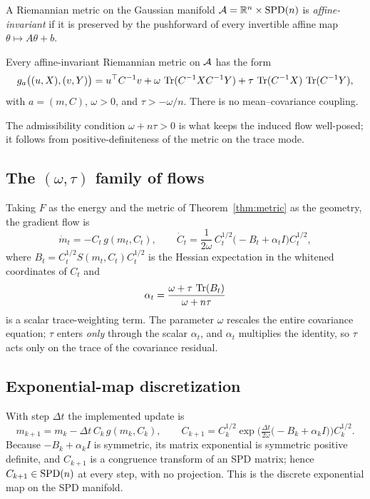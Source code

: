\documentclass[11pt]{article}
\begin{document}
A Riemannian metric on the Gaussian manifold
$\mathcal{A}=\mathbb{R}^{n}\times\mathrm{SPD}(n)$ is \emph{affine-invariant} if it is preserved by the
pushforward of every invertible affine map $\theta\mapsto A\theta+b$.

\begin{theorem}[Classification]\label{thm:metric}
Every affine-invariant Riemannian metric on $\mathcal{A}$ has the form
\begin{equation}
g_a\big((u,X),(v,Y)\big)
  = u^\top C^{-1} v
  + \omega\,\operatorname{Tr}(C^{-1}XC^{-1}Y)
  + \tau\,\operatorname{Tr}(C^{-1}X)\,\operatorname{Tr}(C^{-1}Y),
\end{equation}
with $a=(m,C)$, $\omega>0$, and $\tau>-\omega/n$. There is no mean--covariance
coupling.
\end{theorem}

The admissibility condition $\omega+n\tau>0$ is what keeps the induced flow
well-posed; it follows from positive-definiteness of the metric on the trace
mode.

\subsection{The $(\omega,\tau)$ family of flows}

Taking $F$ as the energy and the metric of Theorem~\ref{thm:metric} as the
geometry, the gradient flow is
\begin{equation}\label{eq:flow}
\dot m_t=-C_t\,g(m_t,C_t),\qquad
\dot C_t=\frac{1}{2\omega}\,C_t^{1/2}\big(-B_t+\alpha_t I\big)C_t^{1/2},
\end{equation}
where $B_t=C_t^{1/2}S(m_t,C_t)C_t^{1/2}$ is the Hessian expectation in the
whitened coordinates of $C_t$ and
\begin{equation}
\alpha_t=\frac{\omega+\tau\,\operatorname{Tr}(B_t)}{\omega+n\tau}
\end{equation}
is a scalar trace-weighting term. The parameter $\omega$ rescales the entire
covariance equation; $\tau$ enters \emph{only} through the scalar $\alpha_t$, and
$\alpha_t$ multiplies the identity, so $\tau$ acts only on the trace of the
covariance residual.

\subsection{Exponential-map discretization}

With step $\Delta t$ the implemented update is
\begin{equation}\label{eq:expmap}
m_{k+1}=m_k-\Delta t\,C_k\,g(m_k,C_k),\qquad
C_{k+1}=C_k^{1/2}\exp\!\Big(\tfrac{\Delta t}{2\omega}\big(-B_k+\alpha_k I\big)\Big)C_k^{1/2}.
\end{equation}
Because $-B_k+\alpha_k I$ is symmetric, its matrix exponential is symmetric
positive definite, and $C_{k+1}$ is a congruence transform of an SPD matrix;
hence $C_{k+1}\in\mathrm{SPD}(n)$ at every step, with no projection. This is the discrete
exponential map on the SPD manifold.
\end{document}
